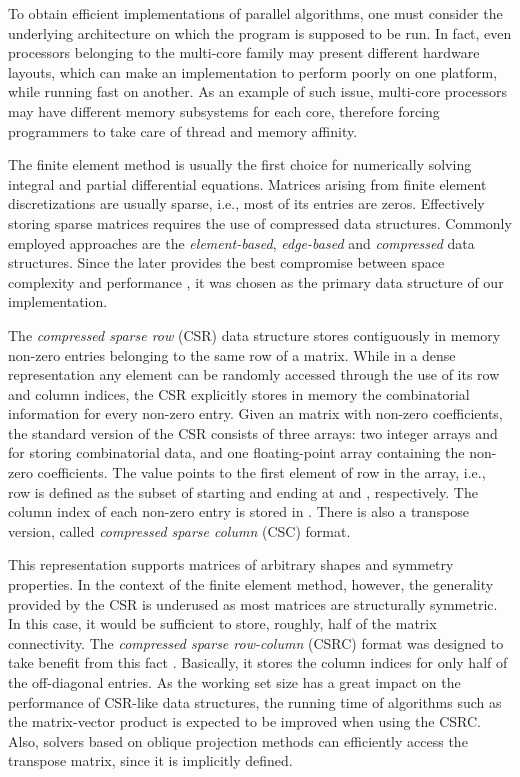 \documentclass[11pt]{article}
\begin{document}
To obtain efficient implementations of parallel algorithms, one must consider
the underlying architecture on which the program is supposed to be run.  In
fact, even processors belonging to the multi-core family may present different
hardware layouts, which can make an implementation to perform poorly on one
platform, while running fast on another.  As an example of such issue,
multi-core processors may have different memory subsystems for each core, therefore
forcing programmers to take care of thread and memory affinity.

The finite element method is usually the first choice for numerically solving
integral and partial differential equations.  Matrices arising from finite
element discretizations are usually sparse, i.e., most of its entries are
zeros.  Effectively storing sparse matrices requires the use of compressed data
structures.  Commonly employed approaches are the \textit{element-based},
\textit{edge-based} and \textit{compressed} data
structures.  Since the later provides the best compromise between space
complexity and performance \cite{RC05a}, it was chosen as the primary data
structure of our implementation.

The \textit{compressed sparse row} (CSR) data structure stores contiguously in memory non-zero entries belonging
to the same row of a matrix.  While in a dense representation any
element can be randomly accessed through the use of its row and
column indices, the CSR explicitly stores in memory the combinatorial
information for every non-zero entry.  Given an  matrix  with 
non-zero coefficients, the standard version of the CSR \cite{Saa95a} consists
of three arrays: two integer arrays  and  for storing
combinatorial data, and one floating-point array  containing the
non-zero coefficients. The value  points to the first element of row 
in the  array, i.e., row  is defined as the subset of  starting and
ending at  and , respectively.  The column index of each
non-zero entry is stored in .  There is also a transpose version,
called \textit{compressed sparse column} (CSC) format.

This representation supports matrices of arbitrary shapes and symmetry
properties.  In the context of the finite element method, however, the
generality provided by the CSR is underused as most matrices are structurally symmetric.
In this case, it would be sufficient to store, roughly, half
of the matrix connectivity. The \textit{compressed sparse row-column} (CSRC)
format was designed to take benefit from this fact \cite{RF07a}.  Basically, it
stores the column indices for only half of the off-diagonal entries.  As the
working set size has a great impact on the performance of CSR-like data
structures, the running time of algorithms such as the matrix-vector product is expected
to be improved when using the CSRC.  Also, solvers based on oblique projection methods can efficiently
access the transpose matrix, since it is implicitly defined.
\end{document}
